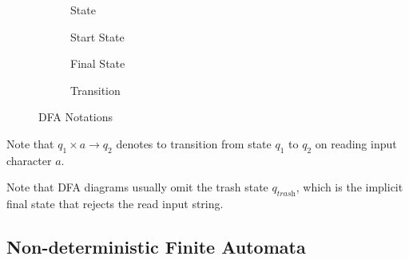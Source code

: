 \begin{definition}
    \begin{figure}[H]
        \centering
        \begin{subfigure}{0.24\textwidth}
            \centering
            \caption{State}
        \end{subfigure}
        \begin{subfigure}{0.24\textwidth}
            \centering
            \caption{Start State}
        \end{subfigure}
        \begin{subfigure}{0.24\textwidth}
            \centering
            \caption{Final State}
        \end{subfigure}
        \begin{subfigure}{0.24\textwidth}
            \centering
            \caption{Transition}
        \end{subfigure}
        \caption{DFA Notations}
        \label{fig:dfa-notations}
    \end{figure}
    
    Note that $q_1 \times a \to q_2$ denotes to transition from state $q_1$ to $q_2$ on reading input character $a$.
\end{definition}

\begin{remark}
    Note that DFA diagrams usually omit the trash state $q_{\textit{trash}}$, which is the implicit final state that rejects the read input string.
\end{remark}

\subsection{Non-deterministic Finite Automata}

